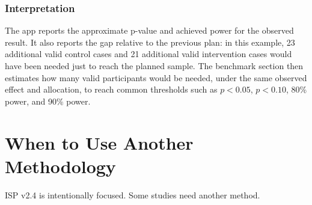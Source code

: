 \documentclass[11pt,a4paper,oneside]{report}
\newcommand{\app}{\textsf{ISP v2.4}\index{ISP v2.4}}
\begin{document}
\subsection*{Interpretation}

The app reports the approximate p-value and achieved power for the observed result. It also reports the gap relative to the previous plan: in this example, 23 additional valid control cases and 21 additional valid intervention cases would have been needed just to reach the planned sample. The benchmark section then estimates how many valid participants would be needed, under the same observed effect and allocation, to reach common thresholds such as \(p<0.05\), \(p<0.10\), 80\% power, and 90\% power.

\chapter{When to Use Another Methodology}

\app{} is intentionally focused. Some studies need another method.
\end{document}
